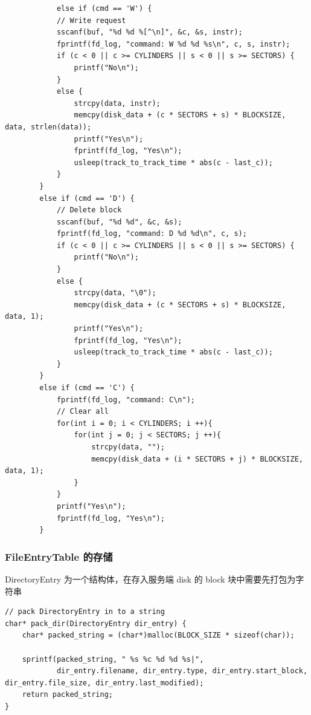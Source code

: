 \documentclass{article}
\begin{document}
\begin{lstlisting}
			else if (cmd == 'W') {
            // Write request
            sscanf(buf, "%d %d %[^\n]", &c, &s, instr);
            fprintf(fd_log, "command: W %d %d %s\n", c, s, instr);
            if (c < 0 || c >= CYLINDERS || s < 0 || s >= SECTORS) {
                printf("No\n");
            }
            else {
                strcpy(data, instr);
                memcpy(disk_data + (c * SECTORS + s) * BLOCKSIZE, data, strlen(data));
                printf("Yes\n");
                fprintf(fd_log, "Yes\n");
                usleep(track_to_track_time * abs(c - last_c));
            }
        }
        else if (cmd == 'D') {
            // Delete block
            sscanf(buf, "%d %d", &c, &s);
            fprintf(fd_log, "command: D %d %d\n", c, s);
            if (c < 0 || c >= CYLINDERS || s < 0 || s >= SECTORS) {
                printf("No\n");
            } 
            else {
                strcpy(data, "\0");
                memcpy(disk_data + (c * SECTORS + s) * BLOCKSIZE, data, 1);
                printf("Yes\n");
                fprintf(fd_log, "Yes\n");
                usleep(track_to_track_time * abs(c - last_c));
            }
        }
        else if (cmd == 'C') {
            fprintf(fd_log, "command: C\n");
            // Clear all
            for(int i = 0; i < CYLINDERS; i ++){
                for(int j = 0; j < SECTORS; j ++){
                    strcpy(data, "");
                    memcpy(disk_data + (i * SECTORS + j) * BLOCKSIZE, data, 1);
                }
            }
            printf("Yes\n");
            fprintf(fd_log, "Yes\n");
        }
\end{lstlisting}

\subsubsection{FileEntryTable 的存储}

DirectoryEntry 为一个结构体，在存入服务端 disk 的 block 块中需要先打包为字符串

\begin{lstlisting}
// pack DirectoryEntry in to a string
char* pack_dir(DirectoryEntry dir_entry) {
    char* packed_string = (char*)malloc(BLOCK_SIZE * sizeof(char));

    sprintf(packed_string, " %s %c %d %d %s|",
            dir_entry.filename, dir_entry.type, dir_entry.start_block, dir_entry.file_size, dir_entry.last_modified);
    return packed_string;
}
\end{lstlisting}
\end{document}
